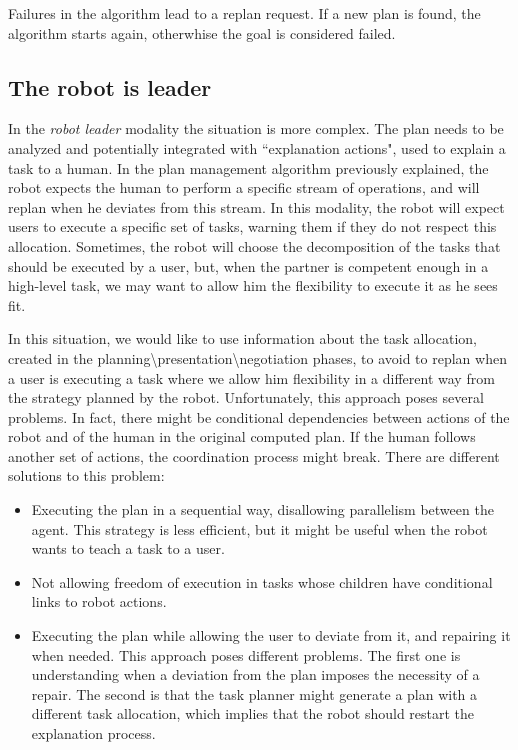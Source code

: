 Failures in the algorithm lead to a replan request. If a new plan is found, the algorithm starts again, otherwhise the goal is considered failed.

\subsection{The robot is leader}

In the \textit{robot leader} modality the situation is more complex. The plan needs to be analyzed and potentially integrated with ``explanation actions", used to explain a task to a human. In the plan management algorithm previously explained, the robot expects the human to perform a specific stream of operations, and will replan when he deviates from this stream. In this modality, the robot will expect users to execute a specific set of tasks, warning them if they do not respect this allocation. Sometimes, the robot will choose the decomposition of the tasks that should be executed by a user, but, when the partner is competent enough in a high-level task,  we may want to allow him the flexibility to execute it as he sees fit. 

In this situation, we would like to use information about the task allocation, created in the planning\textbackslash presentation\textbackslash negotiation phases, to avoid to replan when a user is executing a task where we allow him flexibility in a different way from the strategy planned by the robot.  Unfortunately, this approach poses several problems. In fact, there might be conditional dependencies between actions of the robot and of the human in the original computed plan. If the human follows another set of actions, the coordination process might break. There are different solutions to this problem:
\begin{itemize}
	\item Executing the plan in a sequential way, disallowing parallelism between the agent. This strategy is less efficient, but it might be useful when the robot wants to teach a task to a user.
	\item Not allowing freedom of execution in tasks whose children have conditional links to robot actions. 
	\item Executing the plan while allowing the user to deviate from it, and repairing it when needed. This approach poses different problems. The first one is understanding when a deviation from the plan imposes the necessity of a repair. The second is that the task planner might generate a plan with a different task allocation, which implies that the robot should restart the explanation process.
\end{itemize}


